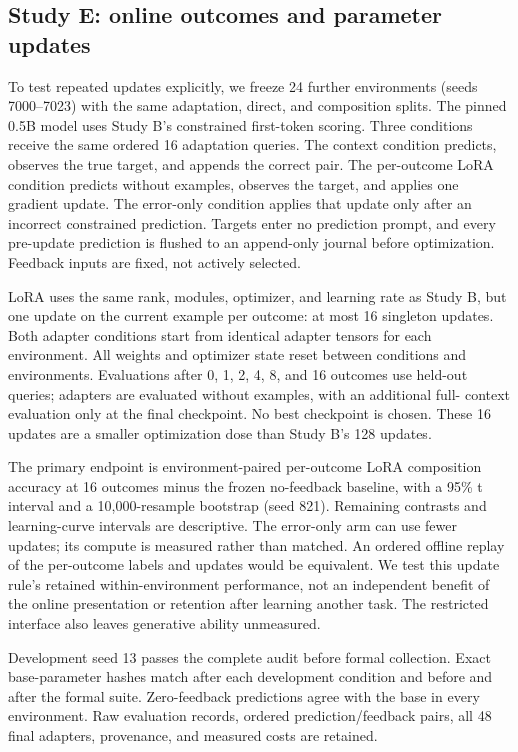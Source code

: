 \documentclass[11pt]{article}
\begin{document}
\subsection{Study E: online outcomes and parameter updates}
To test repeated updates explicitly, we freeze 24 further environments
(seeds 7000--7023) with the same adaptation, direct, and composition splits.
The pinned 0.5B model uses Study B's constrained first-token scoring. Three
conditions receive the same ordered 16 adaptation queries. The context
condition predicts, observes the true target, and appends the correct pair.
The per-outcome LoRA condition predicts without examples, observes the target,
and applies one gradient update. The error-only condition applies that update
only after an incorrect constrained prediction. Targets enter no prediction
prompt, and every pre-update prediction is flushed to an append-only journal
before optimization. Feedback inputs are fixed, not actively selected.

LoRA uses the same rank, modules, optimizer, and learning rate as Study B,
but one update on the current example per outcome: at most 16 singleton
updates. Both adapter conditions start from identical adapter tensors for each
environment. All weights and optimizer state reset between conditions and
environments. Evaluations after 0, 1, 2, 4, 8, and 16 outcomes use held-out
queries; adapters are evaluated without examples, with an additional full-
context evaluation only at the final checkpoint. No best checkpoint is chosen.
These 16 updates are a smaller optimization dose than Study B's 128 updates.

The primary endpoint is environment-paired per-outcome LoRA composition
accuracy at 16 outcomes minus the frozen no-feedback baseline, with a 95\% t
interval and a 10,000-resample bootstrap (seed 821). Remaining contrasts and
learning-curve intervals are descriptive. The error-only arm can use fewer
updates; its compute is measured rather than matched. An ordered offline
replay of the per-outcome labels and updates would be equivalent. We test this
update rule's retained within-environment performance, not an independent
benefit of the online presentation or retention after learning another task.
The restricted interface also leaves generative ability unmeasured.

Development seed 13 passes the complete audit before formal collection.
Exact base-parameter hashes match after each development condition and before
and after the formal suite. Zero-feedback predictions agree with the base
in every environment. Raw evaluation records, ordered prediction/feedback
pairs, all 48 final adapters, provenance, and measured costs are retained.
\end{document}
